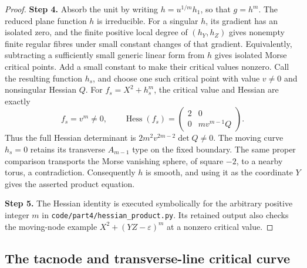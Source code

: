 \begin{proof}
\noindent\textbf{Step 4.} Absorb the unit by writing $h=u^{1/m}h_1$, so that
$g=h^m$. The reduced plane function $h$ is irreducible.
For a singular $h$, its gradient has an isolated zero,
and the finite positive local degree of
$(h_Y,h_Z)$ gives nonempty finite regular fibres under
small constant changes of that gradient. Equivalently,
subtracting a sufficiently small generic linear form
from $h$ gives isolated Morse critical points. Add a
small constant to make their critical values nonzero.
Call the resulting function $h_s$, and choose one such
critical point with value $v\ne0$ and nonsingular Hessian
$Q$. For $f_s=X^2+h_s^m$, the critical value and Hessian
are exactly
\[
 f_s=v^m\ne0,\qquad
 \operatorname{Hess}(f_s)
   =\begin{pmatrix}2&0\\0&m v^{m-1}Q\end{pmatrix}.
\]
Thus the full Hessian determinant is
$2m^2v^{2m-2}\det Q\ne0$. The moving curve $h_s=0$
retains its transverse $A_{m-1}$ type on the fixed
boundary. The same proper comparison transports the
Morse vanishing sphere, of square $-2$, to a nearby
torus, a contradiction. Consequently $h$ is smooth,
and using it as the coordinate $Y$ gives the asserted
product equation.

\noindent\textbf{Step 5.} The Hessian identity is executed symbolically for the
arbitrary positive integer $m$ in
\texttt{code/part4/hessian\_product.py}. Its retained
output also checks the moving-node example
$X^2+(YZ-\varepsilon)^m$ at a nonzero critical value.
\end{proof}


\subsection{The tacnode and transverse-line critical curve}

